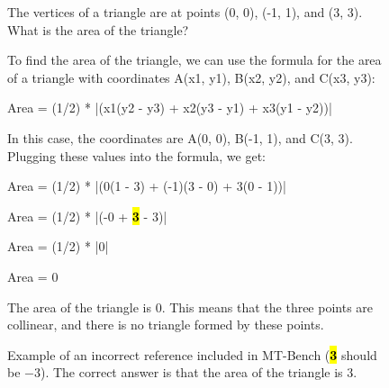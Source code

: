 
\begin{figure}[ht!]
\small
\begin{tcolorbox}[
        enhanced jigsaw, 
        colback=gray!5!white, 
        colframe=gray!90!black, 
        boxrule=1pt, 
        arc=5pt, 
        sharp corners=downhill, 
        left=0pt, right=0pt, top=0pt, bottom=0pt,
        title=MT-Bench Question
    ]
  The vertices of a triangle are at points (0, 0), (-1, 1), and (3, 3). What is the area of the triangle?
\end{tcolorbox}

 \begin{tcolorbox}[
        enhanced jigsaw, 
        colback=providedbg, 
        colframe=providedborder, 
        boxrule=1pt, 
        arc=5pt, 
        sharp corners=downhill, 
        left=0pt, right=0pt, top=0pt, bottom=0pt,
        title=MT-Bench Reference
    ]
To find the area of the triangle, we can use the formula for the area of a triangle with coordinates A(x1, y1), B(x2, y2), and C(x3, y3):

\vspace{0.25em}


Area = (1/2) * |(x1(y2 - y3) + x2(y3 - y1) + x3(y1 - y2))|

\vspace{0.25em}


In this case, the coordinates are A(0, 0), B(-1, 1), and C(3, 3). Plugging these values into the formula, we get:

\vspace{0.25em}


Area = (1/2) * |(0(1 - 3) + (-1)(3 - 0) + 3(0 - 1))|

Area = (1/2) * |(-0 + \hl{{\bf 3}} - 3)|

Area = (1/2) * |0|

Area = 0

\vspace{0.25em}


The area of the triangle is 0. This means that the three points are collinear, and there is no triangle formed by these points.
\end{tcolorbox}

\caption{Example of an incorrect reference included in MT-Bench (\hl{\bf 3} should be $-3$). The correct answer is that the area of the triangle is 3.}
\label{fig:mt-bench-wrong}
\end{figure}

